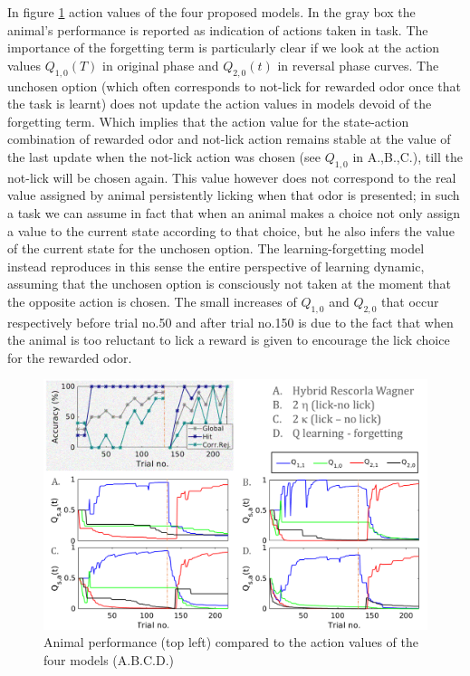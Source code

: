 In figure \ref{fig:4models} action values of the four proposed models. In the gray box the animal's performance is reported as indication of actions taken in task. The importance of the forgetting term is particularly clear if we look at the action values $Q_{1,0}(T)$ in original phase and $Q_{2,0}(t)$ in reversal phase curves. The unchosen option (which often corresponds to not-lick for rewarded odor once that the task is learnt) does not update the action values in models devoid of the forgetting term. Which implies that the action value for the state-action combination of rewarded odor and not-lick action remains stable at the value of the last update when the not-lick action was chosen (see $Q_{1,0}$ in A.,B.,C.), till the not-lick will be chosen again. This value however does not correspond to the real value assigned by animal persistently licking when that odor is presented; in such a task we can assume in fact that when an animal makes a choice not only assign a value to the current state according to that choice, but he also infers the value of the current state for the unchosen option. The learning-forgetting model instead reproduces in this sense the entire perspective of learning dynamic, assuming that the unchosen option is consciously not taken at the moment that the opposite action is chosen. The small increases of $Q_{1,0}$ and $Q_{2,0}$ that occur respectively before trial no.50 and after trial no.150 is due to the fact that when the animal is too reluctant to lick a reward is given to encourage the lick choice for the rewarded odor. 
\begin{figure}
    \centering
    \includegraphics[scale=0.75]{figures/Resume4models3.png}
    \caption{Animal performance (top left) compared to the action values of the four models (A.B.C.D.)}
    \label{fig:4models}
\end{figure}

